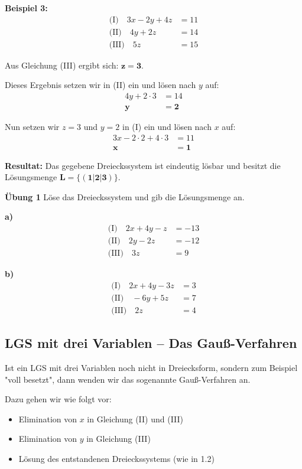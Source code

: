 \documentclass{article}
\begin{document}
\textbf{Beispiel 3:}
\begin{align}
\text{(I)} \quad 3x - 2y + 4z &= 11\\
\text{(II)} \quad 4y + 2z &= 14\\
\text{(III)} \quad 5z &= 15
\end{align}

Aus Gleichung (III) ergibt sich: $\mathbf{z = 3}$.

Dieses Ergebnis setzen wir in (II) ein und lösen nach $y$ auf:
\begin{align}
4y + 2 \cdot 3 &= 14\\
\mathbf{y} &= \mathbf{2}
\end{align}

Nun setzen wir $z = 3$ und $y = 2$ in (I) ein und lösen nach $x$ auf:
\begin{align}
3x - 2 \cdot 2 + 4 \cdot 3 &= 11\\
\mathbf{x} &= \mathbf{1}
\end{align}

\textbf{Resultat:} Das gegebene Dreieckssystem ist eindeutig lösbar und besitzt die Lösungsmenge $\mathbf{L = \{(1|2|3)\}}$.

\begin{framed}
\textbf{Übung 1} Löse das Dreieckssystem und gib die Lösungsmenge an.

\textbf{a)}
\begin{align}
\text{(I)} \quad 2x + 4y - z &= -13\\
\text{(II)} \quad 2y - 2z &= -12\\
\text{(III)} \quad 3z &= 9
\end{align}

\textbf{b)}
\begin{align}
\text{(I)} \quad 2x + 4y - 3z &= 3\\
\text{(II)} \quad -6y + 5z &= 7\\
\text{(III)} \quad 2z &= 4
\end{align}
\end{framed}

\subsection{LGS mit drei Variablen – Das Gauß-Verfahren}

Ist ein LGS mit drei Variablen noch nicht in Dreiecksform, sondern zum Beispiel "voll besetzt", dann wenden wir das sogenannte Gauß-Verfahren an.

Dazu gehen wir wie folgt vor:
\begin{itemize}
\item Elimination von $x$ in Gleichung (II) und (III)
\item Elimination von $y$ in Gleichung (III)
\item Lösung des entstandenen Dreieckssystems (wie in 1.2)
\end{itemize}
\end{document}
